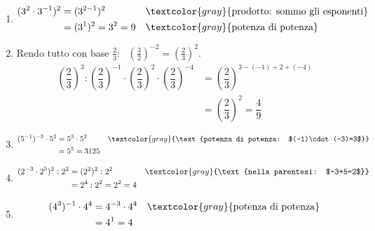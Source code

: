 \begin{question}[ID=1.1, subtitle={Semplificazione di espressioni con potenze}, tags={potenze, semplificazione}, difficulty=facile]
\begin{explanation}
\begin{enumerate}
\[\begin{aligned}
    \end{aligned}\]
    \item \[\begin{aligned}
    (3^2\cdot3^{-1})^2 &= (3^{2-1})^2 && \textcolor{gray}{\text{prodotto: sommo gli esponenti}}\\
    &= (3^1)^2=3^2=9 && \textcolor{gray}{\text{potenza di potenza}}
    \end{aligned}\]
    \item Rendo tutto con base $\tfrac23$: \ $\left(\tfrac32\right)^{-2}=\left(\tfrac23\right)^{2}$.
    \[\begin{aligned}
    \left(\dfrac23\right)^3:\left(\dfrac23\right)^{-1}\cdot\left(\dfrac23\right)^{2}\cdot\left(\dfrac23\right)^{-4} &= \left(\dfrac23\right)^{3-(-1)+2+(-4)}\\
    &= \left(\dfrac23\right)^{2}=\dfrac49
    \end{aligned}\]
    \item \[\begin{aligned}
    (5^{-1})^{-3}\cdot5^2 &= 5^{3}\cdot5^2 && \textcolor{gray}{\text{potenza di potenza: $(-1)\cdot(-3)=3$}}\\
    &= 5^5=3125
    \end{aligned}\]
    \item \[\begin{aligned}
    (2^{-3}\cdot2^5)^2:2^2 &= (2^2)^2:2^2 && \textcolor{gray}{\text{nella parentesi: $-3+5=2$}}\\
    &= 2^4:2^2=2^2=4
    \end{aligned}\]
    \item \[\begin{aligned}
    (4^3)^{-1}\cdot4^4 &= 4^{-3}\cdot4^4 && \textcolor{gray}{\text{potenza di potenza}}\\
    &= 4^{1}=4
    \end{aligned}\]
\end{enumerate}
\end{explanation}
\end{question}


